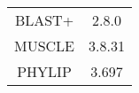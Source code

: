 \begin{table}
\centering 
    \begin{tabular}{| c | c |}
    \hline
        BLAST+ & 2.8.0 \\
        MUSCLE & 3.8.31 \\ 
        PHYLIP & 3.697 \\ 
    \hline
    \end{tabular}
\end{table}